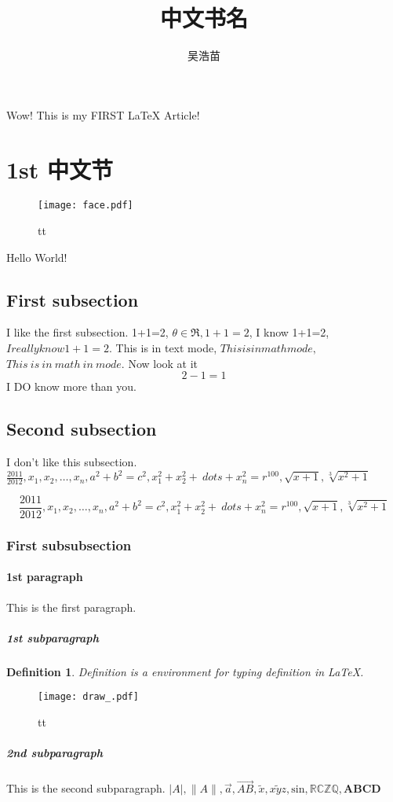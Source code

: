 \documentclass[UTF8]{article} %
\author{吴浩苗}
\title{中文书名}
\newtheorem{definition}{Definition}
\begin{document}
    \begin{CJK}{UTF8}{gkai} 
    \maketitle
    Wow! This is my FIRST \LaTeX{} Article!

    \section{1st 中文节}
     \end{CJK}

\begin{figure}[h]
  \centering
  \texttt{[image: face.pdf]}
  \caption{tt}
  \label{fig1}
\end{figure}
    Hello World!
    \subsection{First subsection}
    I like the first subsection.
    1+1=2, $\theta \in \Re, 1+1=2$, I know 1+1=2, $I really know 1+1=2.$
    This is in text mode, $This is in math mode,$ $This\ is\ in\ math\
in\ mode.$
    Now look at it $$2-1=1$$ I DO know more than you.
    \subsection{Second subsection}
    I don't like this subsection.
    $\frac{2011}{2012}, x_1,x_2,\ldots,x_n, a^2+b^2=c^2, x_1^2+x_2^2+\
dots+x_n^2=r^{100}, \sqrt{x+1}, \sqrt[3]{x^2+1}$

$$\frac{2011}{2012}, x_1,x_2,\ldots,x_n, a^2+b^2=c^2, x_1^2+x_2^2+\
dots+x_n^2=r^{100}, \sqrt{x+1}, \sqrt[3]{x^2+1}$$
    \subsubsection{First subsubsection}
    \paragraph{1st paragraph}
    This is the first paragraph.
    \subparagraph{1st subparagraph}
        \begin{definition}
         Definition is a environment for typing definition in \LaTeX{}.
        \end{definition}
\begin{figure}[h]
  \centering
  \texttt{[image: draw\_.pdf]}
  \caption{tt}
  \label{fig2}
\end{figure}
    \subparagraph{2nd subparagraph}
    This is the second subparagraph.
    $|A|, \|A\|, \vec{a}, \overrightarrow{AB}, \tilde{x}, \widetilde{xyz
}, \mathrm{sin}, \mathbb{RCZQ}, \mathbf{ABCD}$
\end{document}
